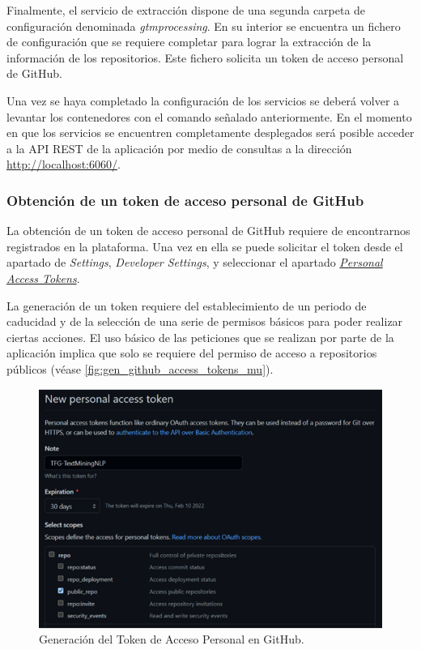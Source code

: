 Finalmente, el servicio de extracción dispone de una segunda carpeta de configuración denominada \textit{gtmprocessing}. En su interior se encuentra un fichero de configuración que se requiere completar para lograr la extracción de la información de los repositorios. Este fichero solicita un token de acceso personal de GitHub.

Una vez se haya completado la configuración de los servicios se deberá volver a levantar los contenedores con el comando señalado anteriormente. En el momento en que los servicios se encuentren completamente desplegados será posible acceder a la API REST de la aplicación por medio de consultas a la dirección \url{http://localhost:6060/}.

\subsubsection{Obtención de un token de acceso personal de GitHub}

La obtención de un token de acceso personal de GitHub requiere de encontrarnos registrados en la plataforma. Una vez en ella se puede solicitar el token desde el apartado de \textit{Settings}, \textit{Developer Settings}, y seleccionar el apartado \href{https://github.com/settings/tokens}{\textit{Personal Access Tokens}}.

La generación de un token requiere del establecimiento de un periodo de caducidad y de la selección de una serie de permisos básicos para poder realizar ciertas acciones. El uso básico de las peticiones que se realizan por parte de la aplicación implica que solo se requiere del permiso de acceso a repositorios públicos (véase \autoref{fig:gen_github_access_tokens_mu}).

\begin{figure}[!ht]
	\centering
    \includegraphics[width=\textwidth]{img/gen_github_access_tokens.png}
	\caption{Generación del Token de Acceso Personal en GitHub.}
	\label{fig:gen_github_access_tokens_mu}
\end{figure}

